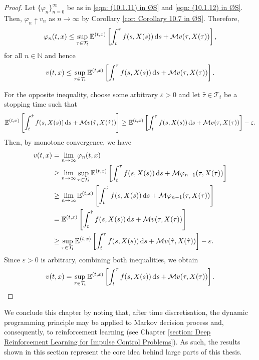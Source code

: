 \begin{proof}
    Let $\{\varphi_n\}_{n=0}^\infty$ be as in \eqref{eqn: (10.1.11) in ØS} and \eqref{eqn: (10.1.12) in ØS}. Then, $\varphi_n \uparrow v_n$ as $n \rightarrow \infty$ by Corollary \ref{cor: Corollary 10.7 in ØS}. Therefore, 
    \begin{equation*}
        \varphi_n(t,x) \leq \sup_{\tau \in \mathcal{T}_t} \mathbb{E}^{(t,x)} \left[ \int_t^\tau f(s,X(s)) \,\mathrm{d} s + \mathcal{M} v(\tau, X(\tau)) \right],
    \end{equation*}
    for all $n \in \mathbb N$ and hence
    \begin{equation*}
        v(t,x) \leq \sup_{\tau \in \mathcal{T}_t} \mathbb{E}^{(t,x)} \left[ \int_t^\tau f(s,X(s)) \,\mathrm{d} s + \mathcal{M} v(\tau, X(\tau)) \right].
    \end{equation*}
    
    For the opposite inequality, choose some arbitrary $\varepsilon>0$ and let $\hat{\tau} \in \mathcal{T}_t$ be a stopping time such that
    \begin{align*}
        \mathbb{E}^{(t,x)} \left[ \int_t^{\hat{\tau}} f(s,X(s)) \,\mathrm{d} s + \mathcal{M} v(\hat{\tau}, X(\hat{\tau}))\right] \geq \mathbb{E}^{(t,x)} \left[ \int_t^\tau f(s,X(s)) \,\mathrm{d} s + \mathcal{M} v(\tau, X(\tau)) \right] - \varepsilon.
    \end{align*}
    Then, by monotone convergence, we have
    \begin{align*}
        v(t,x) &= \lim_{n \rightarrow \infty} \varphi_n(t,x) \\
        & \geq \lim_{n \rightarrow \infty} \sup_{\tau \in \mathcal{T}_t} \mathbb{E}^{(t,x)} \left[ \int_t^{\tau} f(s,X(s)) \,\mathrm{d} s + \mathcal{M} \varphi_{n-1}(\tau,X(\tau))\right] \\
        & \geq \lim_{n \rightarrow \infty} \mathbb{E}^{(t,x)} \left[ \int_t^{\hat{\tau}} f(s,X(s)) \,\mathrm{d} s + \mathcal{M} \varphi_{n-1}(\tau, X(\tau)) \right] \\
        &= \mathbb{E}^{(t,x)} \left[ \int_t^{\hat{\tau}} f(s,X(s)) \,\mathrm{d} s + \mathcal{M} v(\tau,X(\tau)) \right] \\
        & \geq \sup_{\tau \in \mathcal{T}_t} \mathbb{E}^{(t,x)} \left[ \int_t^\tau f(s,X(s)) \,\mathrm{d} s + \mathcal{M} v(\hat{\tau},X(\hat{\tau})) \right] - \varepsilon.
    \end{align*}
    Since $\varepsilon>0$ is arbitrary, combining both inequalities, we obtain
    \begin{equation*}
        v(t,x) = \sup_{\tau \in \mathcal{T}_t} \mathbb{E}^{(t,x)} \left[\int_t^\tau f(s,X(s)) \,\mathrm{d} s + \mathcal{M} v(\tau,X(\tau)) \right].
        \qedhere
    \end{equation*}
\end{proof}

We conclude this chapter by noting that, after time discretisation, the dynamic programming principle may be applied to Markov decision process and, consequently, to reinforcement learning (see Chapter \ref{section: Deep Reinforcement Learning for Impulse Control Problems}). As such, the results shown in this section represent the core idea behind large parts of this thesis.